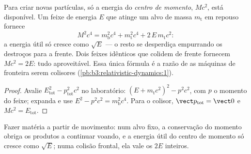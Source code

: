 \begin{proposition}\label{prop:b3:relativistic-dynamics:threshold}
Para criar novas partículas, só a energia do \emph{centro de momento},
$Mc^2$, está disponível. Um feixe de energia $E$ que atinge um alvo de
massa $m_{\text{t}}$ em repouso fornece
\[
M^2c^4 = m_{\text{b}}^2c^4 + m_{\text{t}}^2c^4 +
2\,E\,m_{\text{t}}c^2 :
\]
a energia útil só cresce como $\sqrt E$ --- o resto se desperdiça
empurrando os destroços para a frente. Dois feixes idênticos que
colidem de frente fornecem $Mc^2 = 2E$: tudo aproveitável. Essa única
fórmula é a razão de as máquinas de fronteira serem colisores
(\cref{pb:b3:relativistic-dynamics:1}).
\end{proposition}

\begin{proof}
Avalie $E_{\text{tot}}^2 - p_{\text{tot}}^2c^2$ no laboratório:
$(E + m_{\text{t}}c^2)^2 - p^2c^2$, com $p$ o momento do feixe;
expanda e use $E^2 - p^2c^2 = m_{\text{b}}^2c^4$. Para o colisor,
$\vect p_{\text{tot}} = \vect 0$ e $Mc^2 = E_{\text{tot}}$.
\end{proof}

\begin{omfigure}

{\small Fazer matéria a partir de movimento: num alvo fixo, a
conservação do momento obriga os produtos a continuar voando, e a
energia útil do centro de momento só cresce como $\sqrt E$; numa
colisão frontal, ela vale os $2E$ inteiros.}
\end{omfigure}

